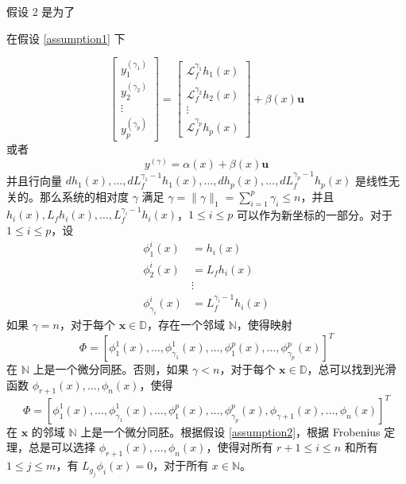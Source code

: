 \begin{remark}
  假设 2 是为了
\end{remark}

在假设 \ref{assumption1} 下

\begin{equation}
	\left.\left[\begin{array}{c}y_1^{(\gamma_1)}\\y_2^{(\gamma_2)}\\\vdots\\y_p^{(\gamma_p)}\end{array}\right.\right]=\left[\begin{array}{cccc}\mathcal{L}_f^{\gamma_1}h_1(x)\\\\\mathcal{L}_f^{\gamma_2}h_2(x)\\\vdots\\\mathcal{L}_f^{\gamma_p}h_p(x)\end{array}\right] +  \beta(x)  \boldsymbol{u}
  \end{equation}
  或者
  \begin{equation}
	y^{(\gamma)}=\alpha(x) + \beta(x) \boldsymbol{u}
	\label{outputdynamic}
  \end{equation}
  并且行向量 $dh_{1}(x),\ldots,dL_{f}^{\gamma_{1}-1}h_{1}(x),\ldots,dh_{p}(x),\ldots,dL_{f}^{\gamma_{p}-1}h_{p}(x)$ 是线性无关的。那么系统的相对度 $\gamma$ 满足 $\gamma=\|\gamma\|_{1}=\sum_{i=1}^{p}\gamma_{i}\leq n$，并且 $h_i(x),L_{f}h_i(x),\ldots,L_{f}^{\gamma_{i}-1}h_i(x)$，$1\leq i\leq p$ 可以作为新坐标的一部分。对于 $1\leq i\leq p$，设 
  \begin{equation}
	\begin{aligned}
	  \phi_{1}^{i}(x)&= h_{i}(x)\\
	  \phi_{2}^{i}(x)&= L_{f}h_{i}(x)\\
	  &\vdots\\
	  \phi_{\gamma_{i}}^{i}(x)&= L_{f}^{\gamma_{i}-1}h_{i}(x) 
	\end{aligned}
  \end{equation}
  如果 $\gamma  = n$，对于每个 $\boldsymbol{x} \in  \mathbb{D}$，存在一个邻域 $\mathbb{N}$，使得映射 
  \begin{equation}
  \Phi=[\phi_{1}^{1}(x),\ldots,\phi_{\gamma_1}^{1}(x),\ldots,\phi_{1}^{p}(x),\ldots,\phi_{\gamma_{p}}^{p}(x)]^{T}
  \end{equation}
  在 $\mathbb{N}$ 上是一个微分同胚。否则，如果 $\gamma < n$，对于每个 $\boldsymbol{x} \in  \mathbb{D}$，总可以找到光滑函数 $\phi_{r+1}(x),\ldots,\phi_{n}(x)$，使得
  \begin{equation}
	\Phi=[\phi_{1}^{1}(x),\ldots,\phi_{\gamma_1}^{1}(x),\ldots,\phi_{1}^{p}(x),\ldots,\phi_{\gamma_{p}}^{p}(x),\phi_{\gamma+1}(x),\ldots,\phi_{n}(x)]^{T}
  \end{equation}
  在 $\boldsymbol{x}$ 的邻域 $\mathbb{N}$ 上是一个微分同胚。根据假设 \ref{assumption2}，根据 Frobenius 定理，总是可以选择 $\phi_{r+1}(x),\ldots,\phi_{n}(x)$，使得对所有 $r+1\leq i\leq n$ 和所有 $1\leq j\leq m$，有 $L_{g_{j}}\phi_{i}(x)=0$，对于所有 $x \in \mathbb{N}$。 
  
